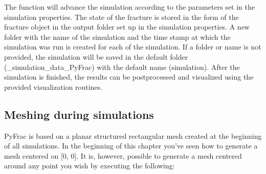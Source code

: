 \documentclass[letterpaper,10pt,english]{sphinxmanual}
\begin{document}
\begin{sphinxVerbatim}[commandchars=\\\{\}]
   

  

\end{sphinxVerbatim}

\sphinxAtStartPar
The  function will advance the simulation according to the parameters set in the simulation properties. The state of the fracture is stored in the form of the fracture object in the output folder set up in the simulation properties. A new folder with the name of the simulation and the time stamp at which the simulation was run is created for each of the simulation. If a folder or name is not provided, the simulation will be saved in the default folder (\_simulation\_data\_PyFrac) with the default name (simulation). After the simulation is finished, the results can be post\sphinxhyphen{}processed and visualized using the provided visualization routines.


\subsection{Meshing during simulations}
\label{\detokenize{RunningASimulation:meshing-during-simulations}}
\sphinxAtStartPar
PyFrac is based on a planar structured rectangular mesh created at the beginning of all simulations. In the beginning of
this chapter you’ve seen how to generate a mesh centered on {[}0, 0{]}. It is, however, possible to generate a mesh centered
around any point you wish by executing the following:

\begin{sphinxVerbatim}[commandchars=\\\{\}]
   

   \PYG{p}{[} \PYG{p}{]}  
\end{sphinxVerbatim}
\end{document}
